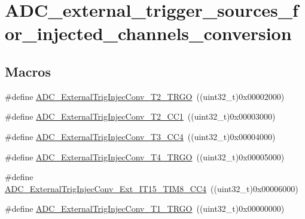 \hypertarget{group___a_d_c__external__trigger__sources__for__injected__channels__conversion}{}\section{A\+D\+C\+\_\+external\+\_\+trigger\+\_\+sources\+\_\+for\+\_\+injected\+\_\+channels\+\_\+conversion}
\label{group___a_d_c__external__trigger__sources__for__injected__channels__conversion}
\subsection*{Macros}
\begin{DoxyCompactItemize}
\item 
\#define \mbox{\hyperlink{group___a_d_c__external__trigger__sources__for__injected__channels__conversion_gaaad112b2b035dfd77c9743197c51b16f}{A\+D\+C\+\_\+\+External\+Trig\+Injec\+Conv\+\_\+\+T2\+\_\+\+T\+R\+GO}}~((uint32\+\_\+t)0x00002000)
\item 
\#define \mbox{\hyperlink{group___a_d_c__external__trigger__sources__for__injected__channels__conversion_ga49089501c5bf2a2c22019fbca4b688e9}{A\+D\+C\+\_\+\+External\+Trig\+Injec\+Conv\+\_\+\+T2\+\_\+\+C\+C1}}~((uint32\+\_\+t)0x00003000)
\item 
\#define \mbox{\hyperlink{group___a_d_c__external__trigger__sources__for__injected__channels__conversion_ga6c9ddf9bba0cefe77dbcd601aed24f7b}{A\+D\+C\+\_\+\+External\+Trig\+Injec\+Conv\+\_\+\+T3\+\_\+\+C\+C4}}~((uint32\+\_\+t)0x00004000)
\item 
\#define \mbox{\hyperlink{group___a_d_c__external__trigger__sources__for__injected__channels__conversion_gab12e5503085cdb9dde4a59614e421284}{A\+D\+C\+\_\+\+External\+Trig\+Injec\+Conv\+\_\+\+T4\+\_\+\+T\+R\+GO}}~((uint32\+\_\+t)0x00005000)
\item 
\#define \mbox{\hyperlink{group___a_d_c__external__trigger__sources__for__injected__channels__conversion_gaa23965b742e08142e5d1c453166dbcc2}{A\+D\+C\+\_\+\+External\+Trig\+Injec\+Conv\+\_\+\+Ext\+\_\+\+I\+T15\+\_\+\+T\+I\+M8\+\_\+\+C\+C4}}~((uint32\+\_\+t)0x00006000)
\item 
\#define \mbox{\hyperlink{group___a_d_c__external__trigger__sources__for__injected__channels__conversion_gabf47f66e60c166f6b63b805f72ad94b0}{A\+D\+C\+\_\+\+External\+Trig\+Injec\+Conv\+\_\+\+T1\+\_\+\+T\+R\+GO}}~((uint32\+\_\+t)0x00000000)
\item 

\end{DoxyCompactItemize}
